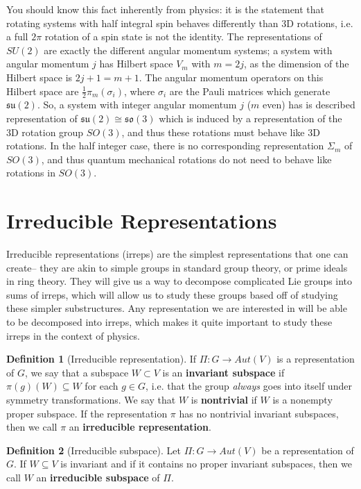 \documentclass[11pt, oneside]{article}   	%
\theoremstyle{definition}
\newtheorem{definition}{Definition}[section]
\begin{document}
You should know this fact inherently from physics: it is the statement that rotating systems with half integral spin behaves 
differently than 3D rotations, i.e. a full $2\pi$ rotation of a spin state is not the identity. The representations of $SU(2)$ are 
exactly the different angular momentum systems; a system with angular momentum $j$ has Hilbert space $V_m$ with 
$m = 2j$, as the dimension of the Hilbert space is $2j + 1 = m + 1$. The angular momentum operators on this Hilbert space 
are $\frac{1}{2}\pi_m(\sigma_i)$, where $\sigma_i$ are the Pauli matrices which generate $\mathfrak{su}(2)$. So, a system with 
integer angular momentum $j$ ($m$ even) has is described representation of $\mathfrak{su}(2)\cong\mathfrak{so}(3)$ which is 
induced by a representation of the 3D rotation group $SO(3)$, and thus these rotations must behave like 3D rotations. In the 
half integer case, there is no corresponding representation $\Sigma_m$ of $SO(3)$, and thus quantum mechanical rotations 
do not need to behave like rotations in $SO(3)$. 

\newpage
\section{Irreducible Representations}

Irreducible representations (irreps) are the simplest representations that one can create-- they are 
akin to simple groups in standard group theory, or prime ideals in ring theory. They will give us a way 
to decompose complicated Lie groups into sums of irreps, which will allow us to study these groups based 
off of studying these simpler substructures. Any representation we are interested in will be able to be 
decomposed into irreps, which makes it quite important to study these irreps in the context of physics. 

\begin{definition}[Irreducible representation]
If $\Pi : G\rightarrow Aut(V)$ is a representation of $G$, we say that a subspace $W\subset V$ is 
an \textbf{invariant subspace} if $\pi(g)(W)\subseteq W$ for each $g\in G$, i.e. that the group 
\textit{always} goes into itself under symmetry transformations. We say that $W$ is \textbf{nontrivial} 
if $W$ is a nonempty proper subspace. If the representation $\pi$ has no nontrivial invariant subspaces, 
then we call $\pi$ an \textbf{irreducible representation}. 
\end{definition}

\begin{definition}[Irreducible subspace]
	Let $\Pi : G\rightarrow Aut(V)$ be a representation of $G$. If $W\subseteq V$ is invariant and if 
	it contains no proper invariant subspaces, then we call $W$ an \textbf{irreducible subspace} of 
	$\Pi$. 
\end{definition}
\end{document}
